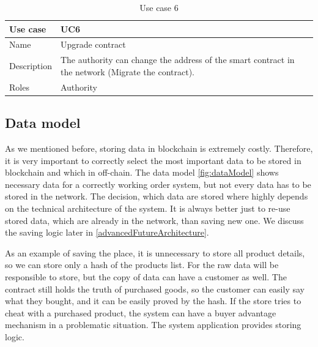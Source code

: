 \documentclass[thesis=M,english]{FITthesis}[2019/12/23]
\begin{document}
\begin{table}[ht!]
\caption{Use case 6} \label{useCase6}
\begin{tabular}{| p{3cm} | p{10cm}|}
\hline
Use case & UC6    \\\hline
Name     & Upgrade contract \\\hline
Description    & The authority can change the address of the smart contract in the network (Migrate the contract).   \\\hline
Roles    & Authority \\\hline
\end{tabular}
\end{table}




\subsection{Data model}
%

As we mentioned before, storing data in blockchain is extremely costly. Therefore, it is very important to correctly select the most important data to be stored in blockchain and which in off-chain. The data model \ref{fig:dataModel} shows necessary data for a correctly working order system, but not every data has to be stored in the network. The decision, which data are stored where highly depends on the technical architecture of the system. It is always better just to re-use stored data, which are already in the network, than saving new one. We discuss the saving logic later in \ref{advancedFutureArchitecture}.

As an example of saving the place, it is unnecessary to store all product details, so we can store only a hash of the products list. For the raw data will be responsible to store, but the copy of data can have a customer as well. The contract still holds the truth of purchased goods, so the customer can easily say what they bought, and it can be easily proved by the hash. If the store tries to cheat with a purchased product, the system can have a buyer advantage mechanism in a problematic situation. The system application provides storing logic.
\end{document}

